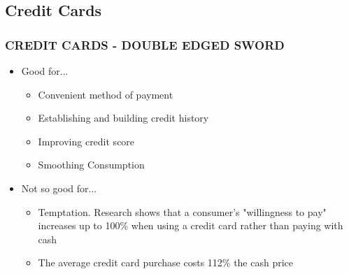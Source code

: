 \documentclass[12pt]{article}
\begin{document}
            \subsection{Credit Cards}
                \subsubsection{CREDIT CARDS - DOUBLE EDGED SWORD}
                    \begin{itemize}
                        \item Good for...
                            \begin{itemize}
                                \item Convenient method of payment
                                \item Establishing and building credit history
                                \item Improving credit score
                                \item Smoothing Consumption
                            \end{itemize}
                        \item Not so good for...
                            \begin{itemize}
                                \item Temptation. Research shows that a consumer's "willingness to pay" increases up to 100\% when using
                                    a credit card rather than paying with cash
                                \item The average credit card purchase costs 112\% the cash price
                            \end{itemize}
                    \end{itemize}
\end{document}
